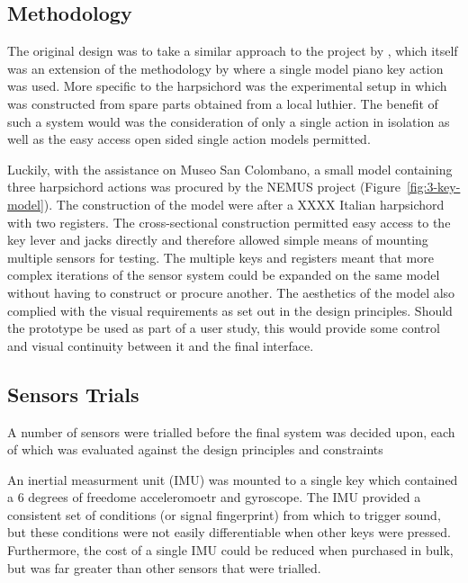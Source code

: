 \subsection{Methodology}

The original design was to take a similar approach to the project by \textcite{timmermans_multibody-based_2020}, which itself was an extension of the methodology by \textcite{gillespie_haptic_1996} where a single model piano key action was used. More specific to the harpsichord was the experimental setup in \textcite{perng_physical_2012} which was constructed from spare parts obtained from a local luthier. The benefit of such a system would was the consideration of only a single action in isolation as well as the easy access open sided single action models permitted. 

Luckily, with the assistance on Museo San Colombano, a small model containing three harpsichord actions was procured by the NEMUS project (Figure~\ref{fig:3-key-model}). The construction of the model were after a XXXX Italian harpsichord with two registers. The cross-sectional construction permitted easy access to the key lever and jacks directly and therefore allowed simple means of mounting multiple sensors for testing. The multiple keys and registers meant that more complex iterations of the sensor system could be expanded on the same model without having to construct or procure another. The aesthetics of the model also complied with the visual requirements as set out in the design principles.
Should the prototype be used as part of a user study, this would provide some control and visual continuity between it and the final interface.

\subsection{Sensors Trials}\label{failed-sensors}

A number of sensors were trialled before the final system was decided upon, each of which was evaluated
against the design principles and constraints

An inertial measurment unit (IMU) was mounted to a single key which contained a 6
degrees of freedome acceleromoetr and gyroscope. The IMU provided a consistent set of
conditions (or signal fingerprint) from which to trigger sound, but these conditions were not easily differentiable when other
keys were pressed. Furthermore, the cost of a single IMU could be reduced when
purchased in bulk, but was far greater than other sensors that were trialled.

